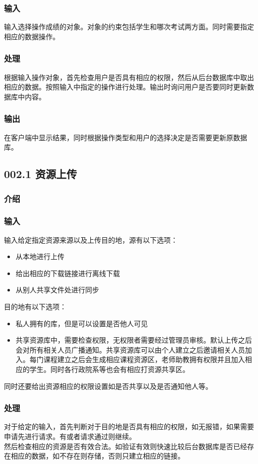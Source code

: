     \subsubsection{输入}
    输入选择操作成绩的对象。对象的约束包括学生和哪次考试两方面。同时需要指定相应的数据操作。
    \subsubsection{处理}
    根据输入操作对象，首先检查用户是否具有相应的权限，然后从后台数据库中取出相应的数据。按照输入中指定的操作进行处理。输出时询问用户是否要同时更新数据库中内容。
    \subsubsection{输出}
    在客户端中显示结果，同时根据操作类型和用户的选择决定是否需要更新原数据库。


  \subsection{002.1 资源上传}
    \subsubsection{介绍}

    \subsubsection{输入}
    输入给定指定资源来源以及上传目的地，源有以下选项：
    \begin{itemize}
      \item 从本地进行上传
      \item 给出相应的下载链接进行离线下载
      \item 从别人共享文件处进行同步
    \end{itemize}
    目的地有以下选项：
    \begin{itemize}
      \item 私人拥有的库，但是可以设置是否他人可见
      \item 共享资源库中，需要检查权限，无权限者需要经过管理员审核。默认上传之后会对所有相关人员广播通知。共享资源库可以由个人建立之后邀请相关人员加入。每门课程建立之后会生成相应课程资源区，老师助教拥有权限并且加入相应的学生。同时各行政院系等也会有相应打资源共享区。
    \end{itemize}
    同时还要给出资源相应的权限设置如是否共享以及是否通知他人等。
    \subsubsection{处理}
    对于给定的输入，首先判断对于目的地是否具有相应的权限，如无报错，如果需要申请先进行请求。有或者请求通过则继续。\\
    然后检查相应的资源是否有效合法。如验证有效则快速比较后台数据库是否已经存在相应的数据，如不存在则存储，否则只建立相应的链接。\\

